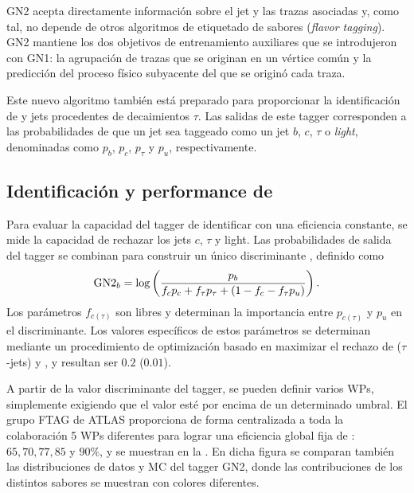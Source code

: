 GN2 acepta directamente información sobre el jet y las trazas asociadas y, como tal, no depende de otros algoritmos de etiquetado de sabores (\textit{flavor tagging}). GN2 mantiene los dos objetivos de entrenamiento auxiliares que se introdujeron con GN1: la agrupación de trazas que se originan en un vértice común y la predicción del proceso físico subyacente del que se originó cada traza.

Este nuevo algoritmo también está preparado para proporcionar la identificación de \cjets y jets procedentes de decaimientos \(\tau\). Las salidas de este tagger corresponden a las probabilidades de que un jet sea taggeado como un jet \(b\), \(c\), \(\tau\) o \textit{light}, denominadas como \(p_b\), \(p_c\), \(p_{\tau}\) y \(p_u\), respectivamente.

\subsection{Identificaci\'on y performance de \btagging}

Para evaluar la capacidad del tagger de identificar \bjets con una eficiencia constante, se mide la capacidad de rechazar los jets \(c\), \(\tau\) y light. Las probabilidades de salida del tagger se combinan para construir un único discriminante \gntb, definido como
\begin{equation}
    \text{GN2}_{b} = \log \left(
        \frac{p_b}{f_c p_c + f_{\tau} p_{\tau} + \left(1-f_c-f_{\tau}p_u\right)}
    \right).
\end{equation}
Los parámetros \(f_{c(\tau)}\) son libres y determinan la importancia entre \(p_{c(\tau)}\) y \(p_u\) en el discriminante. Los valores específicos de estos parámetros se determinan mediante un procedimiento de optimización basado en maximizar el rechazo de \cjets (\(\tau\)-jets) y \ljets, y resultan ser \(0.2\) (\(0.01\)).


A partir de la valor discriminante del tagger, se pueden definir varios \acp{WP}, simplemente exigiendo que el valor \gntb esté por encima de un determinado umbral. El grupo \ac{FTAG} de \ac{ATLAS} proporciona de forma centralizada a toda la colaboración 5 \acp{WP} diferentes para lograr una eficiencia global fija de \btagging: \(65, 70, 77, 85\) y \(90\%\), y se muestran en la \Fig{\ref{fig:objects:jet_tagging:btag_discrminant}}. En dicha figura se comparan tambi\'en las distribuciones de datos y \ac{MC} del tagger GN2, donde las contribuciones de los distintos sabores se muestran con colores diferentes.

